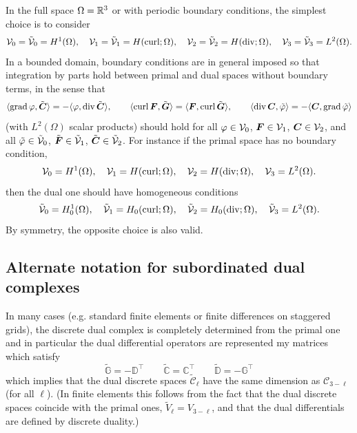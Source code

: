 \documentclass[11pt]{article}
\begin{document}
In the full space $\Omega = \mathbb{R}^3$ or with periodic boundary conditions,
the simplest choice is to consider 
\begin{equation} \label{dR_spaces_nobound}
  \mathcal{V}_0 = \tilde{\mathcal{V}}_0 = H^1(\Omega), \quad
    \mathcal{V}_1 = \tilde{\mathcal{V}}_1 = H(\operatorname{curl};\Omega), \quad
      \mathcal{V}_2 = \tilde{\mathcal{V}}_2 = H(\operatorname{div};\Omega), \quad
        \mathcal{V}_3 = \tilde{\mathcal{V}}_3 = L^2(\Omega).
\end{equation}		
In a bounded domain, boundary conditions are in general imposed
so that integration by parts hold between primal and dual spaces without boundary terms,
in the sense that
$$
\langle\operatorname{grad} {\varphi},\tilde {{\boldsymbol C}}\rangle = -\langle{\varphi},\operatorname{div} \tilde {{\boldsymbol C}}\rangle,
\qquad
\langle\operatorname{curl} {\boldsymbol F},\tilde {{\boldsymbol G}}\rangle = \langle{\boldsymbol F},\operatorname{curl} \tilde {{\boldsymbol G}}\rangle,
\qquad
\langle\operatorname{div} {\boldsymbol C},\tilde {{\varphi}}\rangle = -\langle{\boldsymbol C},\operatorname{grad} \tilde {{\varphi}}\rangle
$$
(with $L^2(\Omega)$ scalar products) 
should hold for all ${\varphi} \in \mathcal{V}_0$, ${\boldsymbol F} \in \mathcal{V}_1$, ${\boldsymbol C} \in \mathcal{V}_2$,
and all $\tilde {{\varphi}} \in \tilde{\mathcal{V}}_0$, $\tilde {{\boldsymbol F}} \in \tilde{\mathcal{V}}_1$,
$\tilde {{\boldsymbol C}} \in \tilde{\mathcal{V}}_2$.
For instance if the primal space has no boundary condition,
\begin{equation} \label{dR_spaces_inhom}
	\mathcal{V}_0 = H^1(\Omega), \quad
    \mathcal{V}_1 = H(\operatorname{curl};\Omega), \quad
      \mathcal{V}_2 = H(\operatorname{div};\Omega), \quad
        \mathcal{V}_3 = L^2(\Omega).
\end{equation}		
then the dual one should have homogeneous conditions
\begin{equation} \label{dR_spaces_hom}
	\tilde{\mathcal{V}}_0 = H^1_0(\Omega), \quad
    \tilde{\mathcal{V}}_1 = H_0(\operatorname{curl};\Omega), \quad
      \tilde{\mathcal{V}}_2 = H_0(\operatorname{div};\Omega), \quad
        \tilde{\mathcal{V}}_3 = L^2(\Omega).
\end{equation}		
By symmetry, the opposite choice is also valid.


\subsection{Alternate notation for subordinated dual complexes}

In many cases (e.g. standard finite elements or finite differences on staggered grids), the discrete dual complex is completely determined from the primal one and in particular the dual differential operators are represented my matrices which satisfy
\begin{equation} \label{diff_T}
	\tilde{\mathbb{G}} = -\mathbb{D}^\top
	\qquad 
	\tilde{\mathbb{C}} = \mathbb{C}^\top
	\qquad
	\tilde{\mathbb{D}} = -\mathbb{G}^\top
\end{equation}
which implies that the dual discrete spaces $\tilde{\mathcal{C}}_\ell$ have the same dimension as $\mathcal{C}_{3-\ell}$
(for all $\ell$). 
(In finite elements this follows from the fact that the dual discrete spaces coincide with the 
primal ones, $\tilde{V}_\ell = V_{3-\ell}$, and that the dual differentials are defined by discrete duality.)
\end{document}
